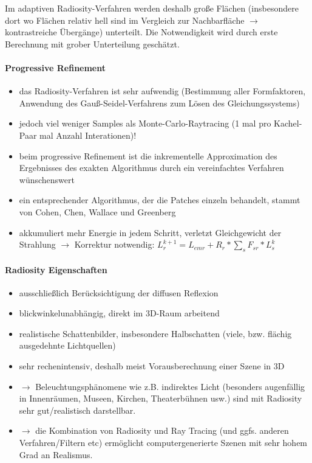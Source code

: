 \documentclass[10pt,landscape]{article}
\begin{document}
\begin{multicols}{3}
Im adaptiven Radiosity-Verfahren werden deshalb große Flächen (insbesondere dort wo Flächen relativ hell sind im Vergleich zur Nachbarfläche $\rightarrow$ kontrastreiche Übergänge) unterteilt. Die Notwendigkeit wird durch erste Berechnung mit grober Unterteilung geschätzt.

\paragraph{Progressive Refinement}
\begin{itemize}
  \item das Radiosity-Verfahren ist sehr aufwendig (Bestimmung aller Formfaktoren, Anwendung des Gauß-Seidel-Verfahrens zum Lösen des Gleichungssystems)
  \item jedoch viel weniger Samples als Monte-Carlo-Raytracing (1 mal pro Kachel-Paar mal Anzahl Interationen)!
  \item beim progressive Refinement ist die inkrementelle Approximation des Ergebnisses des exakten Algorithmus durch ein vereinfachtes Verfahren wünschenswert
  \item ein entsprechender Algorithmus, der die Patches einzeln behandelt, stammt von Cohen, Chen, Wallace und Greenberg
  \item akkumuliert mehr Energie in jedem Schritt, verletzt Gleichgewicht der Strahlung $\rightarrow$ Korrektur notwendig:
        $L_r^{k+1}=L_{emr} + R_r*\sum_s F_{sr}* L_s^k$
\end{itemize}


\paragraph{Radiosity Eigenschaften}
\begin{itemize}
  \item ausschließlich Berücksichtigung der diffusen Reflexion
  \item blickwinkelunabhängig, direkt im 3D-Raum arbeitend
  \item realistische Schattenbilder, insbesondere Halbschatten (viele, bzw. flächig ausgedehnte Lichtquellen)
  \item sehr rechenintensiv, deshalb meist Vorausberechnung einer Szene in 3D
  \item $\rightarrow$ Beleuchtungsphänomene wie z.B. indirektes Licht (besonders augenfällig in Innenräumen, Museen, Kirchen, Theaterbühnen usw.) sind mit Radiosity sehr gut/realistisch darstellbar.
  \item $\rightarrow$ die Kombination von Radiosity und Ray Tracing (und ggfs. anderen Verfahren/Filtern etc) ermöglicht computergenerierte Szenen mit sehr hohem Grad an Realismus.
\end{itemize}


\end{multicols}
\end{document}
